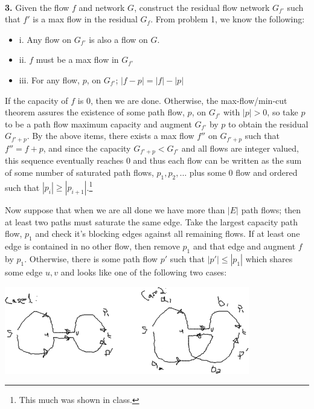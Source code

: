 \documentclass{article}
\begin{document}
\paragraph{} \textbf{3.}
Given the flow $f$ and network $G$, construct the residual flow network $G_{f'}$ such that $f'$ is a max flow in the residual $G_f$.  From problem 1, we know the following:
\begin{itemize}
\item{i.} Any flow on $G_{f'}$ is also a flow on $G$.
\item{ii.} $f$ must be a max flow in $G_{f'}$
\item{iii.} For any flow, $p$, on $G_{f'}$; $|f - p| = |f| - |p|$
\end{itemize}
If the capacity of $f$ is 0, then we are done.  Otherwise, the max-flow/min-cut theorem assures the existence of some path flow, $p$, on $G_{f'}$ with $|p| > 0$, so take $p$ to be a path flow maximum capacity and augment $G_{f'}$ by $p$ to obtain the residual $G_{f' + p}$.  By the above items, there exists a max flow $f''$ on $G_{f' + p}$ such that $f'' = f + p$, and since the capacity $G_{f'+p} < G_{f'}$ and all flows are integer valued, this sequence eventually reaches 0 and thus each flow can be written as the sum of some number of saturated path flows, $p_1, p_2, ... $ plus some 0 flow and ordered such that $|p_i| \geq |p_{i+1}|$.\footnote{This much was shown in class.}

Now suppose that when we are all done we have more than $|E|$ path flows; then at least two paths must saturate the same edge.  Take the largest capacity path flow, $p_1$ and check it's blocking edges against all remaining flows.  If at least one edge is contained in no other flow, then remove $p_1$ and that edge and augment $f$ by $p_1$.  Otherwise, there is some path flow $p'$ such that $|p'| \leq |p_1|$ which shares some edge $u,v$ and looks like one of the following two cases:

\begin{center}
\includegraphics[height=1.5in]{5-3-1.png}
\end{center}
\end{document}
